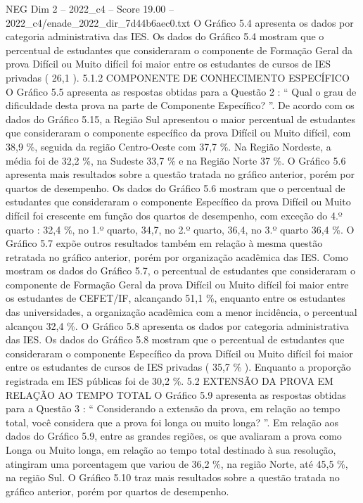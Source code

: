 \begin{textsample}{NEG Dim 2 – 2022\_c4 – Score 19.00 – 2022\_c4/enade\_2022\_dir\_7d44b6aec0.txt}
O Gráfico 5.4 apresenta os dados por categoria administrativa das IES.
Os dados do Gráfico 5.4 mostram que o percentual de estudantes que consideraram o componente de Formação Geral da prova Difícil ou Muito difícil foi maior entre os estudantes de cursos de IES privadas ( 26,1 ). 5.1.2 COMPONENTE DE CONHECIMENTO ESPECÍFICO O Gráfico 5.5 apresenta as respostas obtidas para a Questão 2 : “ Qual o grau de dificuldade desta prova na parte de Componente Específico? ”.
De acordo com os dados do Gráfico 5.15, a Região Sul apresentou o maior percentual de estudantes que consideraram o componente específico da prova Difícil ou Muito difícil, com 38,9 \%, seguida da região Centro-Oeste com 37,7 \%.
Na Região Nordeste, a média foi de 32,2 \%, na Sudeste 33,7 \% e na Região Norte 37 \%.
O Gráfico 5.6 apresenta mais resultados sobre a questão tratada no gráfico anterior, porém por quartos de desempenho.
Os dados do Gráfico 5.6 mostram que o percentual de estudantes que consideraram o componente Específico da prova Difícil ou Muito difícil foi crescente em função dos quartos de desempenho, com exceção do 4.º quarto : 32,4 \%, no 1.º quarto, 34,7, no 2.º quarto, 36,4, no 3.º quarto 36,4 \%.
O Gráfico 5.7 expõe outros resultados também em relação à mesma questão retratada no gráfico anterior, porém por organização acadêmica das IES.
Como mostram os dados do Gráfico 5.7, o percentual de estudantes que consideraram o componente de Formação Geral da prova Difícil ou Muito difícil foi maior entre os estudantes de CEFET/IF, alcançando 51,1 \%, enquanto entre os estudantes das universidades, a organização acadêmica com a menor incidência, o percentual alcançou 32,4 \%.
O Gráfico 5.8 apresenta os dados por categoria administrativa das IES.
Os dados do Gráfico 5.8 mostram que o percentual de estudantes que consideraram o componente Específico da prova Difícil ou Muito difícil foi maior entre os estudantes de cursos de IES privadas ( 35,7 \% ).
Enquanto a proporção registrada em IES públicas foi de 30,2 \%. 5.2 EXTENSÃO DA PROVA EM RELAÇÃO AO TEMPO TOTAL O Gráfico 5.9 apresenta as respostas obtidas para a Questão 3 : “ Considerando a extensão da prova, em relação ao tempo total, você considera que a prova foi longa ou muito longa? ”.
Em relação aos dados do Gráfico 5.9, entre as grandes regiões, os que avaliaram a prova como Longa ou Muito longa, em relação ao tempo total destinado à sua resolução, atingiram uma porcentagem que variou de 36,2 \%, na região Norte, até 45,5 \%, na região Sul.
O Gráfico 5.10 traz mais resultados sobre a questão tratada no gráfico anterior, porém por quartos de desempenho.

\end{textsample}
